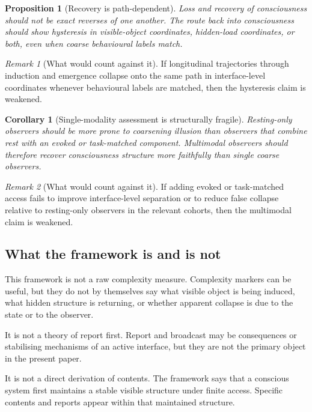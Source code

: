 \documentclass[11pt,a4paper]{article}
\numberwithin{equation}{section}
\theoremstyle{thmcompact}
\newtheorem{proposition}[theorem]{Proposition}
\newtheorem{corollary}[theorem]{Corollary}
\theoremstyle{remark}
\newtheorem*{remarkplain}{Remark}
\newenvironment{remark}[1][]%
{\begin{remarkbox}\begin{remarkplain}[#1]\normalfont}
{\end{remarkplain}\end{remarkbox}}
\begin{document}
\begin{proposition}[Recovery is path-dependent]
\label{prop:hysteresis}
Loss and recovery of consciousness should not be exact reverses of one another. The route back into consciousness should show hysteresis in visible-object coordinates, hidden-load coordinates, or both, even when coarse behavioural labels match.
\end{proposition}

\begin{remark}[What would count against it]
If longitudinal trajectories through induction and emergence collapse onto the same path in interface-level coordinates whenever behavioural labels are matched, then the hysteresis claim is weakened.
\end{remark}

\begin{corollary}[Single-modality assessment is structurally fragile]
\label{cor:single-modality}
Resting-only observers should be more prone to coarsening illusion than observers that combine rest with an evoked or task-matched component. Multimodal observers should therefore recover consciousness structure more faithfully than single coarse observers.
\end{corollary}

\begin{remark}[What would count against it]
If adding evoked or task-matched access fails to improve interface-level separation or to reduce false collapse relative to resting-only observers in the relevant cohorts, then the multimodal claim is weakened.
\end{remark}

\subsection{What the framework is and is not}

This framework is not a raw complexity measure. Complexity markers can be useful, but they do not by themselves say what visible object is being induced, what hidden structure is returning, or whether apparent collapse is due to the state or to the observer.

It is not a theory of report first. Report and broadcast may be consequences or stabilising mechanisms of an active interface, but they are not the primary object in the present paper.

It is not a direct derivation of contents. The framework says that a conscious system first maintains a stable visible structure under finite access. Specific contents and reports appear within that maintained structure.
\end{document}
